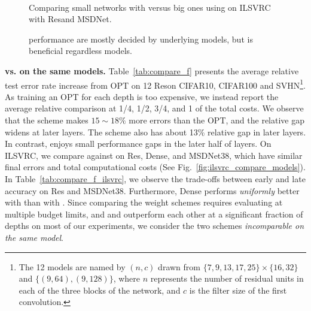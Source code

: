 \begin{figure}[h]
    \centering
        
    ~
    \caption{Comparing small networks with \adaloss versus big ones using \const on ILSVRC with Res\anns and MSDNet. }    
\end{figure}

\begin{figure}[h]
\centering

	\caption{\anns performance are mostly decided by underlying models, but \adaloss is beneficial regardless models.   } 
\end{figure}
    


\textbf{\adaloss vs. \const on the same models.} Table~\ref{tab:compare_f} presents the average relative test error rate increase from OPT on 12  Res\anns on CIFAR10, CIFAR100 and SVHN\footnote{The 12 models are named by $(n,c)$ drawn from $\{ 7, 9, 13, 17, 25 \} \times \{ 16, 32 \}$ and $\{(9,64), (9,128)\}$, where $n$ represents the number of residual units in each of the three blocks of the network, and $c$ is the filter size of the first convolution.}. As training an OPT for each depth is too expensive, we instead report the average relative comparison at 1/4, 1/2, 3/4, and 1 of the total \ann costs. 
We observe that the \const scheme makes $15\sim 18\%$ more errors than the OPT, and the relative gap widens at later layers.  The \linear scheme also has about 13\% relative gap in later layers. In contrast, \adaloss enjoys small performance gaps in the later half of layers. 
On ILSVRC, we compare \adaloss against \const on Res, Dense, and MSDNet38, which have similar final errors and total computational costs (See Fig.~\ref{fig:ilsvrc_compare_models}). In Table~\ref{tab:compare_f_ilsvrc}, we observe the trade-offs between early and late accuracy on Res and MSDNet38. Furthermore, Dense performs \emph{uniformly} better with \adaloss than with \const. 
Since comparing the weight schemes requires evaluating \anns at multiple budget limits, and \adaloss and \const outperform each other at a significant fraction of depths on most of our experiments, we consider the two schemes \emph{incomparable on the same model}. 

